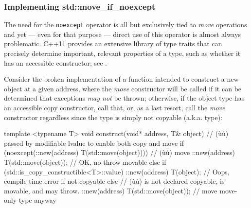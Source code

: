 \subsubsection[Implementing \lstinline!std::move_if_noexcept!]{Implementing {\SubsubsecCode std::move\_if\_noexcept}}\label{implementing-std::move_if_noexcept}

The need for the \lstinline!noexcept! operator is all but exclusively tied
to \emph{move} operations and yet --- even for that purpose --- direct
use of this operator is almost always problematic. C++11 provides an
extensive library of type traits that can precisely determine important,
relevant properties of a type, such as whether it has an accessible
constructor; see .

Consider the broken implementation of a function intended to construct a
new object at a given address, where the \emph{move} constructor will be
called if it can be determined that exceptions \emph{may not} be thrown;
otherwise, if the object type has an accessible copy constructor, call
that, or, as a last resort, call the \emph{move} constructor regardless
since the type is simply not copyable (a.k.a.  type):

\begin{emcppslisting}
template <typename T>
void construct(void* address, T& object)
     // (ù{}ù) passed by modifiable lvalue to enable both copy and move
{
    if (noexcept(::new(address) T(std::move(object))))  // (ù{}ù) move
    {
        ::new(address) T(std::move(object));   // OK, no-throw movable
    }
    else if (std::is_copy_constructible<T>::value)
    {
        ::new(address) T(object);  // Oops, compile-time error if not copyable
    }
    else // (ù{}ù) is not declared copyable, is movable, and may throw.
    {
        ::new(address) T(std::move(object));  // move move-only type anyway
    }
}
\end{emcppslisting}
    

